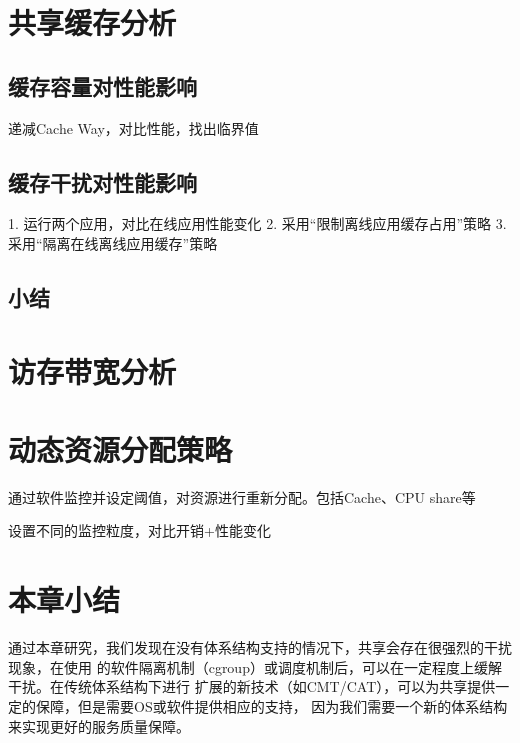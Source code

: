 \section{共享缓存分析}

\subsection{缓存容量对性能影响}

递减Cache Way，对比性能，找出临界值

\subsection{缓存干扰对性能影响}

1. 运行两个应用，对比在线应用性能变化
2. 采用``限制离线应用缓存占用''策略
3. 采用``隔离在线离线应用缓存''策略

\subsection{小结}

\section{访存带宽分析}

\section{动态资源分配策略}

通过软件监控并设定阈值，对资源进行重新分配。包括Cache、CPU share等

设置不同的监控粒度，对比开销+性能变化



\section{本章小结}

通过本章研究，我们发现在没有体系结构支持的情况下，共享会存在很强烈的干扰现象，在使用
的软件隔离机制（cgroup）或调度机制后，可以在一定程度上缓解干扰。在传统体系结构下进行
扩展的新技术（如CMT/CAT），可以为共享提供一定的保障，但是需要OS或软件提供相应的支持，
因为我们需要一个新的体系结构来实现更好的服务质量保障。

\fi

